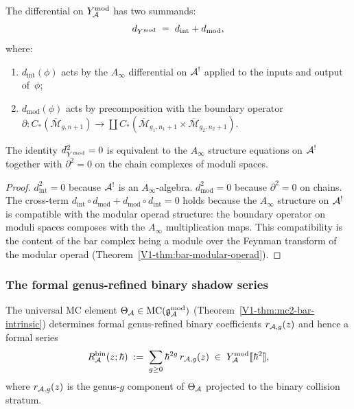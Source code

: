 \begin{proposition}
The differential on $Y^{\mathrm{mod}}_{\mathcal{A}}$ has two summands:
\begin{equation}%
d_{\Ymod}
\;=\;
d_{\mathrm{int}} + d_{\mathrm{mod}},
\end{equation}
where:
\begin{enumerate}[label=\textup{(\roman*)}]
\item $d_{\mathrm{int}}(\phi)$ acts by the $A_\infty$ differential
 on $\mathcal{A}^!$ applied to the inputs and output of~$\phi$;
\item $d_{\mathrm{mod}}(\phi)$ acts by precomposition with the
 boundary operator
 $\partial\colon C_*(\overline{\mathcal{M}}_{g,n+1})
 \to \coprod C_*(\overline{\mathcal{M}}_{g_1,n_1+1}
 \times \overline{\mathcal{M}}_{g_2,n_2+1})$.
\end{enumerate}
The identity $d_{Y^{\mathrm{mod}}}^2 = 0$ is equivalent to the $A_\infty$
structure equations on $\mathcal{A}^!$ together with $\partial^2 = 0$ on the
chain complexes of moduli spaces.
\end{proposition}

\begin{proof}
$d_{\mathrm{int}}^2 = 0$ because $\mathcal{A}^!$ is an $A_\infty$-algebra.
$d_{\mathrm{mod}}^2 = 0$ because $\partial^2 = 0$ on chains.
The cross-term
$d_{\mathrm{int}} \circ d_{\mathrm{mod}} +
d_{\mathrm{mod}} \circ d_{\mathrm{int}} = 0$
holds because the $A_\infty$ structure on $\mathcal{A}^!$ is compatible
with the modular operad structure: the boundary operator on moduli
spaces composes with the $A_\infty$ multiplication maps. This
compatibility is the content of the bar complex being a
module over the Feynman transform of the modular operad
(Theorem~\ref{V1-thm:bar-modular-operad}).
\end{proof}


\subsubsection{The formal genus-refined binary shadow series}

\begin{theorem}
The universal MC element $\Theta_{\mathcal{A}} \in \mathrm{MC}(\mathfrak{g}_{\mathcal{A}}^{\mathrm{mod}})$
\textup{(}Theorem~\textup{\ref*{V1-thm:mc2-bar-intrinsic})}
determines formal genus-refined binary coefficients
$r_{\mathcal{A},g}(z)$ and hence a formal series
\begin{equation}%
R^{\mathrm{bin}}_\cA(z;\hbar)
\;:=\;
\sum_{g \geq 0}
\hbar^{2g}\,r_{\cA,g}(z)
\;\in\;
\Ymod_\cA[\![\hbar^2]\!],
\end{equation}
where $r_{\mathcal{A},g}(z)$ is the genus-$g$ component of
$\Theta_{\mathcal{A}}$ projected to the binary collision stratum.
\end{theorem}

